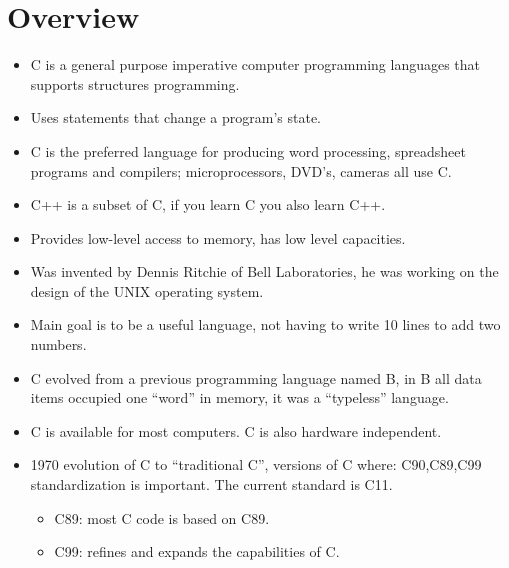 \section{Overview}
\begin{itemize}
    \item C is a general purpose imperative computer programming languages that supports structures programming. 
    \item Uses statements that change a program's state. 
    \item C is the preferred language for producing word processing, spreadsheet programs and compilers; microprocessors, DVD's, cameras all use C. 
    \item C++ is a subset of C, if you learn C you also learn C++.
    \item Provides low-level access to memory, has low level capacities. 
    \item Was invented by Dennis Ritchie of Bell Laboratories, he was working on the design of the UNIX operating system. 
    \item Main goal is to be a useful language, not having to write 10 lines to add two numbers.
    \item C evolved from a previous programming language named B, in B all data items occupied one ``word'' in memory, it was a ``typeless'' language. 
    \item C is available for most computers. C is also hardware independent. 
    \item 1970 evolution of C to ``traditional C'', versions of C where: C90,C89,C99 standardization is important. The current standard is C11.
        \begin{itemize}
            \item C89: most C code is based on C89.
            \item C99: refines and expands the capabilities of C. 
        \end{itemize}
\end{itemize}


